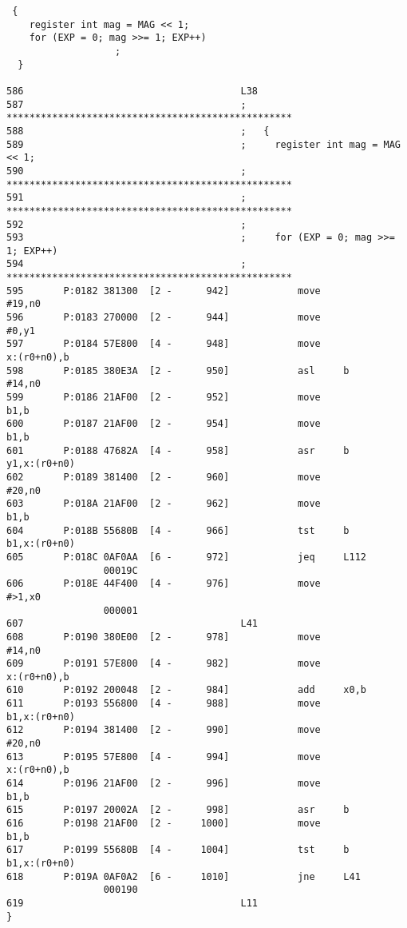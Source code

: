 {\small
\begin{verbatim}
 {	
    register int mag = MAG << 1;
    for (EXP = 0; mag >>= 1; EXP++)
                   ; 
  } 

586                                      L38
587                                      ; **************************************************
588                                      ;   {
589                                      ;     register int mag = MAG << 1;
590                                      ; **************************************************
591                                      ; **************************************************
592                                      ; 
593                                      ;     for (EXP = 0; mag >>= 1; EXP++)
594                                      ; **************************************************
595       P:0182 381300  [2 -      942]            move              #19,n0
596       P:0183 270000  [2 -      944]            move              #0,y1
597       P:0184 57E800  [4 -      948]            move              x:(r0+n0),b
598       P:0185 380E3A  [2 -      950]            asl     b         #14,n0
599       P:0186 21AF00  [2 -      952]            move              b1,b
600       P:0187 21AF00  [2 -      954]            move              b1,b
601       P:0188 47682A  [4 -      958]            asr     b         y1,x:(r0+n0)
602       P:0189 381400  [2 -      960]            move              #20,n0
603       P:018A 21AF00  [2 -      962]            move              b1,b
604       P:018B 55680B  [4 -      966]            tst     b         b1,x:(r0+n0)
605       P:018C 0AF0AA  [6 -      972]            jeq     L112
                 00019C
606       P:018E 44F400  [4 -      976]            move              #>1,x0
                 000001
607                                      L41
608       P:0190 380E00  [2 -      978]            move              #14,n0
609       P:0191 57E800  [4 -      982]            move              x:(r0+n0),b
610       P:0192 200048  [2 -      984]            add     x0,b
611       P:0193 556800  [4 -      988]            move              b1,x:(r0+n0)
612       P:0194 381400  [2 -      990]            move              #20,n0
613       P:0195 57E800  [4 -      994]            move              x:(r0+n0),b
614       P:0196 21AF00  [2 -      996]            move              b1,b
615       P:0197 20002A  [2 -      998]            asr     b
616       P:0198 21AF00  [2 -     1000]            move              b1,b
617       P:0199 55680B  [4 -     1004]            tst     b         b1,x:(r0+n0)
618       P:019A 0AF0A2  [6 -     1010]            jne     L41
                 000190
619                                      L11
}
\end{verbatim}
}

